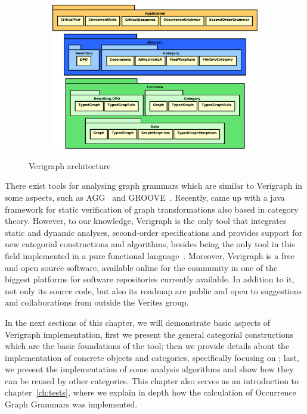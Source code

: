 \begin{figure}[!ht]
  \centering
  \begin{subfigure}[t]{.5\textwidth}
    \centerline{\includegraphics[scale=0.6]{images/verigraph/layers}}
  \end{subfigure}
  \caption{Verigraph architecture}\label{fig:verigraph:layers}
\end{figure}
There exist tools for analysing graph grammars which are similar to Verigraph in some aspects, such as AGG~\cite{Taentzer2000} and GROOVE~\cite{Rensink2004}. Recently, \cite{Deckwerth2016} came up with a java framework for static verification of graph transformations also based in category theory.  However, to our knowledge, Verigraph is the only tool that integrates static and dynamic analyses, second-order specifications and provides support for new categorial constructions and algorithms, besides being the only tool in this field implemented in a pure functional language~\cite{Costa2016}. Moreover, Verigraph is a free and open source software, available online for the community in one of the biggest platforms for software repositories currently available. In addition to it, not only its source code, but also its roadmap are public and open to suggestions and collaborations from outside the Verites group.

In the next sections of this chapter, we will demonstrate basic aspects of Verigraph implementation, first we present the general categorial constructions which are the basic foundations of the tool; then we provide details about the implementation of concrete objects and categories, specifically focusing on \typedGraphCategory{}; last, we present the implementation of some analysis algorithms and show how they can be reused by other categories. This chapter also serves as an introduction to chapter~\ref{ch:tests}, where we explain in depth how the calculation of Occurrence Graph Grammars was implemented.

